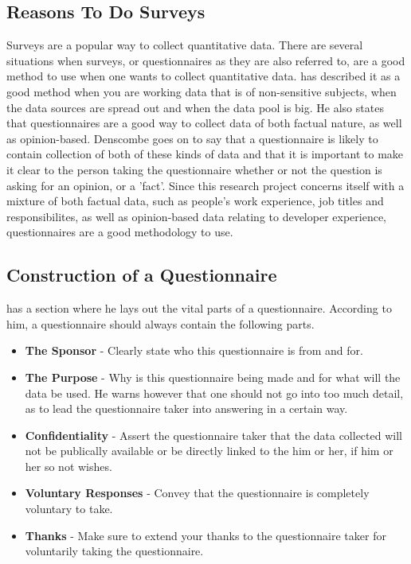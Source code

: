 \documentclass{cslthse-msc}
\begin{document}
    \subsection{Reasons To Do Surveys}
    Surveys are a popular way to collect quantitative data.
    There are several situations when surveys, or questionnaires as they are also referred to, are a good
    method to use when one wants to collect quantitative data. \citet{denscombe} has described it as a good method when you are
    working data that is of non-sensitive subjects, when the data sources are spread out and when the data pool is big.
    He also states that questionnaires are a good way to collect data of both factual nature, as well as opinion-based.
    Denscombe goes on to say that a questionnaire is likely to contain collection of both of these kinds of data and that it is
    important to make it clear to the person taking the questionnaire whether or not the question is asking for an opinion, or a 'fact'.
    Since this research project concerns itself with a mixture of both factual data, such as people's work experience, job titles and responsibilites, as well as opinion-based data relating to developer experience, questionnaires are a good methodology to use.

    \subsection{Construction of a Questionnaire}
    \citet{denscombe} has a section where he lays out the vital parts of a questionnaire. According to him, a questionnaire should always contain the following parts.

    \begin{itemize}
        \item \textbf{The Sponsor} - Clearly state who this questionnaire is from and for.
        \item \textbf{The Purpose} - Why is this questionnaire being made and for what will the data be used. He warns however that one should not go into too much detail, as to lead the questionnaire taker into answering in a certain way.
        \item \textbf{Confidentiality} - Assert the questionnaire taker that the data collected will not be publically available or be directly linked to the him or her, if him or her so not wishes.
        \item \textbf{Voluntary Responses} - Convey that the questionnaire is completely voluntary to take.
        \item \textbf{Thanks} - Make sure to extend your thanks to the questionnaire taker for voluntarily taking the questionnaire.
    \end{itemize}
\end{document}
